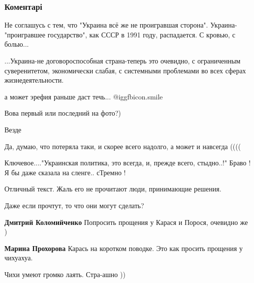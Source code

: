  
 
 
 
 
\subsubsection{Коментарі}
\label{sec:16_10_2019.fb.lesev_igor.1.ldnr_rospusk.cmt}

\begin{itemize} %

Не соглашусь с тем, что "Украина всё же не проигравшая сторона".
Украина-"проигравшее государство", как СССР в 1991 году, распадается. С кровью,
с болью...

...Украина-не договороспособная страна-теперь это очевидно, с ограниченным
суверенитетом, экономически слабая, с системными проблемами во всех сферах
жизнедеятельности.

а может эрефия раньше даст течь...  @igg{fbicon.smile} 

Вова первый или последний на фото?)

Везде

Да, думаю, что потеряла таки, и скорее всего надолго, а может и навсегда ((((

Ключевое...."Украинская политика, это всегда, и, прежде всего, стыдно..!" Браво ! Я бы даже сказала на сленге.. сТремно !

Отличный текст. Жаль его не прочитают люди, принимающие решения.

\begin{itemize} %
Даже если прочтут, то что они могут сделать?

\textbf{Дмитрий Коломийченко} Попросить прощения у Карася и Порося, очевидно же )

\textbf{Марина Прохорова} Карась на коротком поводке. Это как просить прощения у чихуахуа.

Чихи умеют громко лаять. Стра-ашно ))



\end{itemize}
\end{itemize}
